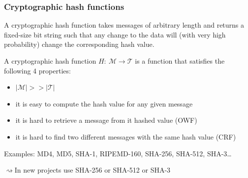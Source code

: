 \documentclass[aspectratio=169, lualatex, 10pt,dvipsnames,svgnames]{beamer} %
\def\envert#1{\textcolor{vert}{#1}}
\def\enrouge#1{\textcolor{rouge}{#1}}
\newcommand{\Mcal}{\mathcal{M}}
\newcommand{\Tcal}{\mathcal{T}}
\begin{document}
\begin{frame}

  \frametitle{Cryptographic hash functions}

  A cryptographic hash function takes messages of arbitrary length and returns a fixed-size bit string such that any change to the data will (with very high probability) change the corresponding hash value.

  \begin{definition}
    A cryptographic hash function $H:\ \Mcal \rightarrow \Tcal$ is a function that satisfies the following 4 properties:
    \begin{itemize}
    \item $|\Mcal| >> |\Tcal|$
    \item it is easy to compute the hash value for any given message 
    \item it is hard to retrieve a message from it hashed value (OWF)
    \item it is hard to find two different messages with the same hash value (CRF)
    \end{itemize}
  \end{definition}
  \medskip{}
  
  \envert{Examples: MD4, MD5, SHA-1, RIPEMD-160, SHA-256, SHA-512, SHA-3\dots}\medskip

  \enrouge{$\rightsquigarrow$In new projects use SHA-256 or SHA-512 or SHA-3}

  

  
\end{frame}
\end{document}
